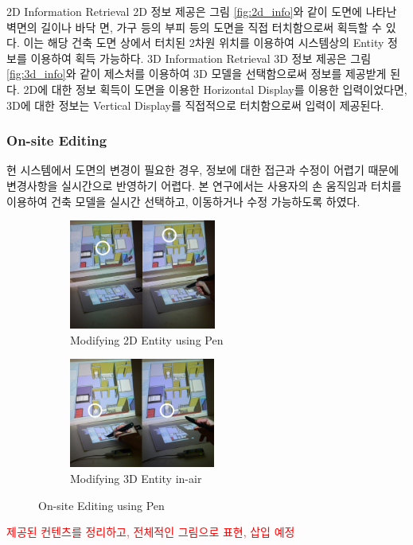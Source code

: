 2D Information Retrieval
2D 정보 제공은 그림 \ref{fig:2d_info}와 같이 도면에 나타난 벽면의 길이나 바닥 면, 가구 등의 부피 등의 도면을 직접 터치함으로써 획득할 수 있다. 이는 해당 건축 도면 상에서 터치된 2차원 위치를 이용하여 시스템상의 Entity 정보를 이용하여 획득 가능하다.
3D Information Retrieval
3D 정보 제공은 그림 \ref{fig:3d_info}와 같이 제스처를 이용하여 3D 모델을 선택함으로써 정보를 제공받게 된다. 2D에 대한 정보 획득이 도면을 이용한 Horizontal Display를 이용한 입력이었다면, 3D에 대한 정보는 Vertical Display를 직접적으로 터치함으로써 입력이 제공된다. 

\subsubsection{On-site Editing}
현 시스템에서 도면의 변경이 필요한 경우, 정보에 대한 접근과 수정이 어렵기 때문에 변경사항을 실시간으로 반영하기 어렵다. 본 연구에서는 사용자의 손 움직임과 터치를 이용하여 건축 모델을 실시간 선택하고, 이동하거나 수정 가능하도록 하였다. 
\begin{figure}[h!]
    \centering
        \begin{subfigure}[b]{0.49\columnwidth}
            \centering
                \includegraphics[width=1.0\columnwidth, height=3.6cm]{4-Interaction_Design/2d_move}
                \caption{Modifying 2D Entity using Pen}
                \label{fig:Pen_move}
        \end{subfigure}%
        \hfill
        \begin{subfigure}[b]{0.49\columnwidth}
            \centering
            \includegraphics[width=1.0\columnwidth, height=3.6cm]{4-Interaction_Design/3d_note}
                \caption{Modifying 3D Entity in-air}
                \label{fig:Annotation}
        \end{subfigure}
    \caption{On-site Editing using Pen}
    \label{fig:edit}
\end{figure}

\textcolor{red}{제공된 컨텐츠를 정리하고, 전체적인 그림으로 표현, 삽입 예정}

